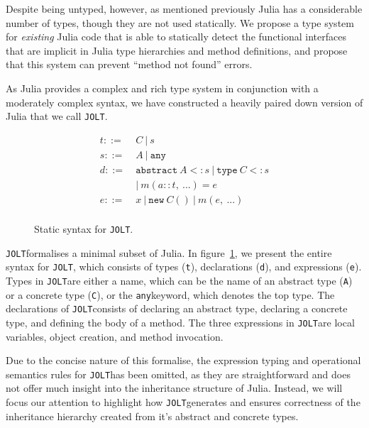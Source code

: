 \documentclass[preprint]{sigplanconf}
\newcommand{\xt}[1]{\texttt{#1}}
\newcommand{\abstype}[2]{\xt{abstract}~#1 <: #2}
\newcommand{\oftype}[2]{#1::#2}
\newcommand{\m}[2]{{#1}(#2)}
\newcommand{\contype}[2]{\xt{type}~#1 <: #2}
\newcommand{\any}{\xt{any}}
\newcommand{\jolt}{\xt{JOLT}}
\renewcommand{\ldots}{...}
\begin{document}
Despite being untyped, however, as mentioned previously Julia has a considerable
number of types, though they are not used statically. We propose a type system
for \emph{existing} Julia code that is able to statically detect the functional
interfaces that are implicit in Julia type hierarchies and method definitions,
and propose that this system can prevent ``method not found'' errors.

As Julia provides a complex and rich type system in conjunction with a moderately
complex syntax, we have constructed a heavily paired down version of Julia that we call \jolt.

\begin{figure}
\begin{align*}
t ::=~&  C ~|~ s\\
s ::=~& A ~|~ \any\\
d ::=~& \abstype{A}{s} ~|~ \contype{C}{s} \\
  & |~ \m{m}{\oftype{a}{t}, ~\ldots} = e\\
e ::=~& x ~|~ \xt{new} ~ C() ~|~ m(e,~\ldots) \\
\end{align*}
\caption{Static syntax for \jolt.}
\label{fm:syntax}
\end{figure}

\jolt\space formalises a minimal subset of Julia. In figure~\ref{fm:syntax}, we present the entire
syntax for \jolt, which consists of types (\xt{t}), declarations (\xt{d}), and expressions (\xt{e}). 
Types in \jolt\space are either a name, which can be the name of an abstract type (\xt{A}) or a concrete type (\xt{C}), 
or the \any\space keyword, which denotes the top type. The declarations 
of \jolt\space consists of declaring an abstract type, declaring a concrete type, and defining the body of a method.
The three expressions in \jolt\space are local variables, object creation, and method invocation. 

Due to the concise nature of this formalise, the expression typing and operational semantics rules for \jolt has
been omitted, as they are straightforward and does not offer much insight into the inheritance structure of Julia. 
Instead, we will focus our attention to highlight how \jolt\space generates and ensures correctness of the inheritance
hierarchy created from it's abstract and concrete types. 
\end{document}
